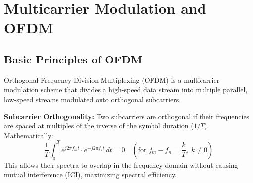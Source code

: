 \documentclass[12pt,a4paper]{article}
\begin{document}
\begin{tcolorbox}[tikzbox, title={GMSK Transmitter Block Diagram}]
\centering
{}
\end{tcolorbox}

\section{Multicarrier Modulation and OFDM}

\subsection{Basic Principles of OFDM}
Orthogonal Frequency Division Multiplexing (OFDM) is a multicarrier modulation scheme that divides a high-speed data stream into multiple parallel, low-speed streams modulated onto orthogonal subcarriers.

\begin{tcolorbox}[defbox]
\textbf{Subcarrier Orthogonality:} Two subcarriers are orthogonal if their frequencies are spaced at multiples of the inverse of the symbol duration ($1/T$). Mathematically:
\begin{equation}
  \frac{1}{T}\int_{0}^{T} e^{j 2\pi f_m t} \cdot e^{-j 2\pi f_n t} \, dt = 0 \quad (\text{for } f_m - f_n = \frac{k}{T}, \; k \neq 0)
\end{equation}
This allows their spectra to overlap in the frequency domain without causing mutual interference (ICI), maximizing spectral efficiency.
\end{tcolorbox}
\end{document}
